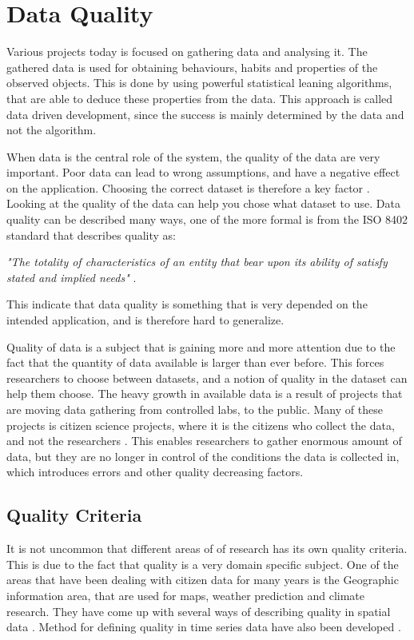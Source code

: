 \chapter{Data Quality}
Various projects today is focused on gathering data and analysing it. The gathered data is used for obtaining behaviours, habits and properties of the observed objects. This is done by using powerful statistical leaning algorithms, that are able to deduce these properties from the data. This approach is called data driven development, since the success is mainly determined by the data and not the algorithm. 

When data is the central role of the system, the quality of the data are very important. Poor data can lead to wrong assumptions, and have a negative effect on the application. Choosing the correct dataset is therefore a key factor \cite{RefWorks:3}. Looking at the quality of the data can help you chose what dataset to use. Data quality can be described many ways, one of the more formal is from the ISO 8402 standard that describes quality as: 

\begin{adjustwidth}{2.5em}{2.5em}
\emph{"The totality of characteristics of an entity that bear upon its ability of satisfy stated and implied needs"} \cite{RefWorks:5}.
\end{adjustwidth}

This indicate that data quality is something that is very depended on the intended application, and is therefore hard to generalize. 

Quality of data is a subject that is gaining more and more attention due to the fact that the quantity of data available is larger than ever before. This forces researchers to choose between datasets, and a notion of quality in the dataset can help them choose. The heavy growth in available data is a result of projects that are moving data gathering from controlled labs, to the public. Many of these projects is citizen science projects, where it is the citizens who collect the data, and not the researchers \cite{RefWorks:2}. This enables researchers to gather enormous amount of data, but they are no longer in control of the conditions the data is collected in, which introduces errors and other quality decreasing factors. 

\section{Quality Criteria}
It is not uncommon that different areas of of research has its own quality criteria. This is due to the fact that quality is a very domain specific subject. One of the areas that have been dealing with citizen data for many years is the Geographic information area, that are used for maps, weather prediction and climate research. They have come up with several ways of describing quality in spatial data \cite{RefWorks:7}. Method for defining quality in time series data have also been developed  \cite{RefWorks:6}. 

